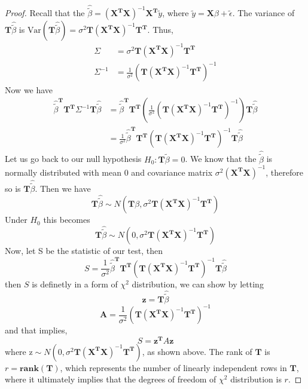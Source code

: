 \documentclass[12pt]{article}
\newcommand{\ytilde}{\tilde{y}}
\newcommand{\X}{\mathbf{X}}
\newcommand{\btilde}{\tilde{\beta}}
\newcommand{\etilde}{\tilde{\epsilon}}
\newcommand{\T}{\mathbf{T}}
\begin{document}
\begin{enumerate}[1.]
\begin{enumerate}[a)]
                    \begin{proof}
                        Recall that the $\hat{\btilde} = (\X^\T \X)^{-1} \X^\T \ytilde$, where $\ytilde = \X \beta + \etilde$.
                        The variance of $\T \hat{\btilde}$ is $\text{Var}(\T \hat{\btilde}) = \sigma^2 \T (\X^\T \X)^{-1} \T^\T$.
                        Thus, 
                        \begin{align*}
                            \Sigma &= \sigma^2 \T (\X^\T \X)^{-1} \T^\T \\
                            \Sigma^{-1} &= \frac{1}{\sigma^2} (\T (\X^\T \X)^{-1} \T^\T)^{-1}
                        \end{align*}
                        Now we have
                        \begin{align*}
                            \hat{\btilde}^\T \T^\T \Sigma^{-1} \T \hat{\btilde} 
                            &= \hat{\btilde}^\T \T^\T \left(\frac{1}{\sigma^2} (\T (\X^\T \X)^{-1} \T^\T)^{-1}\right) \T \hat{\btilde} \\
                            &= \frac{1}{\sigma^2} \hat{\btilde}^\T \T^\T (\T (\X^\T \X)^{-1} \T^\T)^{-1} \T \hat{\btilde}
                        \end{align*}
                        Let us go back to our null hypothesis $H_0: \T \btilde = 0$. We know that the $\hat{\btilde}$ 
                        is normally distributed with mean 0 and covariance matrix $\sigma^2 (\X^\T \X)^{-1}$, therefore so is
                        $\T \hat{\btilde}$. Then we have
                        \[\T\hat{\btilde} \sim N(\T\beta, \sigma^2 \T (\X^\T \X)^{-1} \T^\T)\]
                        Under $H_0$ this becomes
                        \[\T\hat{\btilde} \sim N(0, \sigma^2 \T (\X^\T \X)^{-1} \T^\T)\]
                        Now, let S be the statistic of our test, then
                        \[S = \frac{1}{\sigma^2} \hat{\btilde}^\T \T^\T (\T (\X^\T \X)^{-1} \T^\T)^{-1} \T \hat{\btilde} \]
                        then $S$ is definetly in a form of $\chi^2$ distribution, we can show by letting
                        \[\textbf{z} = \T \hat{\btilde}\]
                        \[\textbf{A} = \frac{1}{\sigma^2} (\T (\X^\T \X)^{-1} \T^\T)^{-1} \]
                        and that implies, 
                        \[S = \textbf{z}^\T A \textbf{z}\]
                        where $\text{z} \sim N(0, \sigma^2 \T (\X^\T \X)^{-1} \T^\T)$, as shown above. The rank of 
                        $\T$ is $r = \textbf{rank}(\T)$, which represents the number of linearly independent rows in $\T$, where it
                        ultimately implies that the degrees of freedom of $\chi^2$ distribution is $r$.


\end{proof}
\end{enumerate}
\end{enumerate}
\end{document}
